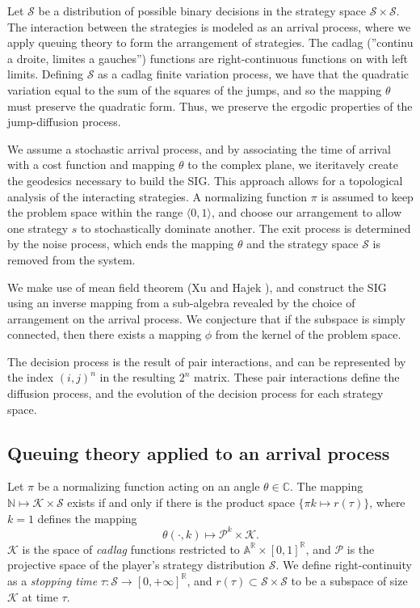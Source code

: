 \documentclass[11pt]{article}
\theoremstyle{definition}
\newcommand{\mcP}{\mathcal{P}}
\newcommand{\mcK}{\mathcal{K}}
\newcommand{\mcS}{\mathcal{S}}
\begin{document}
Let $\mcS$ be a distribution of possible binary decisions in the strategy space
$\mcS \times \mcS$. The interaction between the strategies is modeled as an
arrival process, where we apply queuing theory to form the arrangement of
strategies. The cadlag (”continu a droite, limites a gauches”) functions are
right-continuous functions on with left limits. Defining $\mcS$ as a cadlag
finite variation process, we have that the quadratic variation equal to the sum
of the squares of the jumps, and so the mapping $\theta$ must preserve the
quadratic form. Thus, we preserve the ergodic properties of the jump-diffusion
process.


We assume a stochastic arrival process, and by associating the time of
arrival with a cost function and mapping $\theta$ to the complex plane, we
iteritavely create the geodesics necessary to build the SIG. This approach
allows for a topological analysis of the interacting strategies. A normalizing
function $\pi$ is assumed to keep the problem space within the range $\langle 0,
1 \rangle$, and choose our arrangement to allow one strategy $s$ to
stochastically dominate another. The exit process is determined by the noise
process, which ends the mapping $\theta$ and the strategy space $\mcS$ is
removed from the system.

We make use of mean field theorem (Xu and
Hajek ), and construct the SIG using an inverse mapping
from a sub-algebra revealed by the choice of arrangement on the arrival process.
We conjecture that if the subspace is simply connected, then there exists a
mapping $\phi$ from the kernel of the problem space.

The decision process is the result of pair interactions,
and can be represented by the index $(i,j)^n$ in the
resulting $2^n$ matrix. These pair interactions define the diffusion process,
and the evolution of the decision process for each strategy space.

\subsection{Queuing theory applied to an arrival process}

Let $\pi$ be a normalizing function acting on an angle $\theta \in \mathbb{C}$.
The mapping $\mathbb{N} \mapsto \mcK\times \mcS$ exists if and only if there is
the product space $\lbrace \pi k \mapsto r(\tau)\rbrace$, where $k=1$ defines
the mapping 
$$
    \theta(\cdot, k) \mapsto \mcP^k \times \mcK.
$$
$\mcK$ is the space of \emph{cadlag} functions restricted to
$\mathbb{A}^\mathbb{R} \times [0,1]^\mathbb{R}$,
and $\mcP$ is the projective space of the
player's strategy distribution $\mcS$. We define right-continuity as 
a \emph{stopping time} $\tau:\mcS \rightarrow [0,+\infty]^\mathbb{R}$, and
$r(\tau) \subset \mcS \times \mcS$ to be a subspace of size $\mcK$ at time $\tau$.
\end{document}
